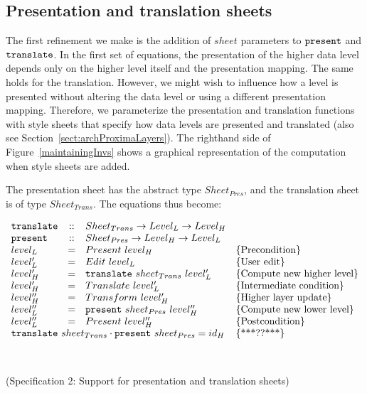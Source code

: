 %																
%																
%																
\subsection{Presentation and translation sheets} \label{sect:maintainingSheet}

The first refinement we make is the addition of $sheet$ parameters to ${\tt present}$ and ${\tt translate}$. In the first set of equations, the presentation of the higher data level depends only on the higher level itself and the presentation mapping. The same holds for the translation. However, we might wish to influence how a level is presented without altering the data level or using a different presentation mapping. Therefore, we parameterize the presentation and translation functions with style sheets that specify how data levels are presented and translated (also see Section~\ref{sect:archProximaLayers}). The righthand side of Figure~\ref{maintainingInvs} shows a graphical representation of the computation when style sheets are added. 

The presentation sheet has the abstract type $Sheet_{Pres}$, and the translation sheet is of type $Sheet_{Trans}$. The equations thus become:

\begin{small}\( \begin{array}{lcll} \label{inv:sheets}
{\tt translate} &::& Sheet_{Trans} \rightarrow  Level_{L} \rightarrow Level_{H} \\
{\tt present} &::& Sheet_{Pres} \rightarrow  Level_{H} \rightarrow Level_{L} \\
level_{L} & = & Present~level_{H}					& \text{\{Precondition\}}\\
level'_{L} & = & Edit~level_{L}						& \text{\{User edit\}}\\
level'_{H} & = & {\tt translate}~sheet_{Trans}~level'_{L}	& \text{\{Compute new higher level\}}\\
level'_{H} & = & Translate~level'_{L}					& \text{\{Intermediate condition\}}\\
level''_{H}& = & Transform~level'_{H} 					& \text{\{Higher layer update\}}\\
level''_{L} & = & {\tt present}~sheet_{Pres}~level''_{H}    & \text{\{Compute new lower level\}}\\
level''_{L} & = & Present~level''_{H}					& \text{\{Postcondition\}}\\
\lefteqn{{\tt translate}~sheet_{Trans} \cdot {\tt present}~sheet_{Pres} = id_{H}} & & & \text{\{***??***\}}\\
\end{array}\)\end{small}\\
\begin{center}(Specification 2: Support for presentation and translation sheets)\end{center}\vspace{1em}

